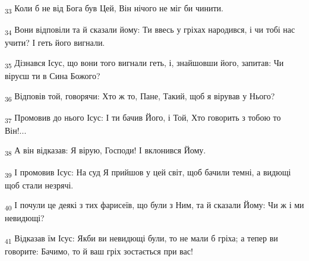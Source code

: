 \begin{tcolorbox}
\textsubscript{33} Коли б не від Бога був Цей, Він нічого не міг би чинити.
\end{tcolorbox}
\begin{tcolorbox}
\textsubscript{34} Вони відповіли та й сказали йому: Ти ввесь у гріхах народився, і чи тобі нас учити? І геть його вигнали.
\end{tcolorbox}
\begin{tcolorbox}
\textsubscript{35} Дізнався Ісус, що вони того вигнали геть, і, знайшовши його, запитав: Чи віруєш ти в Сина Божого?
\end{tcolorbox}
\begin{tcolorbox}
\textsubscript{36} Відповів той, говорячи: Хто ж то, Пане, Такий, щоб я вірував у Нього?
\end{tcolorbox}
\begin{tcolorbox}
\textsubscript{37} Промовив до нього Ісус: І ти бачив Його, і Той, Хто говорить з тобою то Він!...
\end{tcolorbox}
\begin{tcolorbox}
\textsubscript{38} А він відказав: Я вірую, Господи! І вклонився Йому.
\end{tcolorbox}
\begin{tcolorbox}
\textsubscript{39} І промовив Ісус: На суд Я прийшов у цей світ, щоб бачили темні, а видющі щоб стали незрячі.
\end{tcolorbox}
\begin{tcolorbox}
\textsubscript{40} І почули це деякі з тих фарисеїв, що були з Ним, та й сказали Йому: Чи ж і ми невидющі?
\end{tcolorbox}
\begin{tcolorbox}
\textsubscript{41} Відказав їм Ісус: Якби ви невидющі були, то не мали б гріха; а тепер ви говорите: Бачимо, то й ваш гріх зостається при вас!
\end{tcolorbox}
